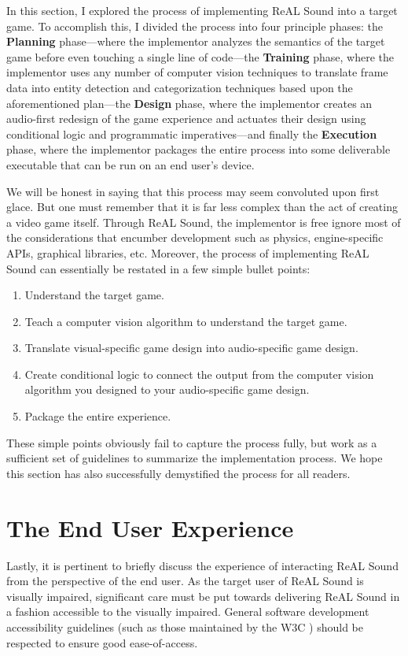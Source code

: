 \documentclass{report}
\newcommand{\rs}{ReAL Sound\xspace}
\newcommand{\plan}{\textbf{Planning}\xspace}
\newcommand{\train}{\textbf{Training}\xspace}
\newcommand{\design}{\textbf{Design}\xspace}
\newcommand{\exec}{\textbf{Execution}\xspace}
\newcommand{\imp}{implementor\xspace}
\begin{document}
In this section, I explored the process of implementing \rs into a target game. To accomplish this, I divided the process into four principle phases: the \plan phase---where the \imp analyzes the semantics of the target game before even touching a single line of code---the \train phase, where the \imp uses any number of computer vision techniques to translate frame data into entity detection and categorization techniques based upon the aforementioned plan---the \design phase, where the \imp creates an audio-first redesign of the game experience and actuates their design using conditional logic and programmatic imperatives---and finally the \exec phase, where the \imp packages the entire process into some deliverable executable that can be run on an end user's device. 

We will be honest in saying that this process may seem convoluted upon first glace. But one must remember that it is far less complex than the act of creating a video game itself. Through \rs, the implementor is free ignore most of the considerations that encumber development such as physics, engine-specific APIs, graphical libraries, etc. Moreover, the process of implementing \rs can essentially be restated in a few simple bullet points:


\begin{enumerate}
    \item Understand the target game.
    \item Teach a computer vision algorithm to understand the target game.
    \item Translate visual-specific game design into audio-specific game design.
    \item Create conditional logic to connect the output from the computer vision algorithm you designed to your audio-specific game design. 
    \item Package the entire experience.
\end{enumerate}

These simple points obviously fail to capture the process fully, but work as a sufficient set of guidelines to summarize the implementation process. We hope this section has also successfully demystified the process for all readers.

\section{The End User Experience}
Lastly, it is pertinent to briefly discuss the experience of interacting \rs from the perspective of the end user. As the target user of \rs is visually impaired, significant care must be put towards delivering \rs in a fashion accessible to the visually impaired. General software development accessibility guidelines (such as those maintained by the W3C \cite{Spellman:24:WAG}) should be respected to ensure good ease-of-access. 
\end{document}
